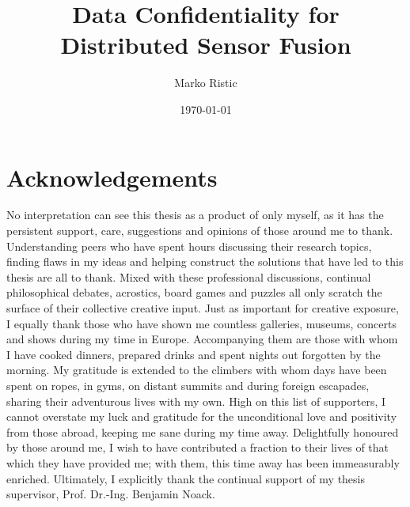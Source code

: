 \documentclass[oneside]{scrbook}
\title{Data Confidentiality for Distributed Sensor Fusion}
\author{Marko Ristic}
\date{\today}
\theoremstyle{definition}
\theoremstyle{definition}
\theoremstyle{remark}
\begin{document}
\maketitle

\frontmatter
\tableofcontents

% 
%                                     
%                                     
%                                     
% 

\chapter{Acknowledgements}
No interpretation can see this thesis as a product of only myself, as it has the persistent support, care, suggestions and opinions of those around me to thank. Understanding peers who have spent hours discussing their research topics, finding flaws in my ideas and helping construct the solutions that have led to this thesis are all to thank. Mixed with these professional discussions, continual philosophical debates, acrostics, board games and puzzles all only scratch the surface of their collective creative input. Just as important for creative exposure, I equally thank those who have shown me countless galleries, museums, concerts and shows during my time in Europe. Accompanying them are those with whom I have cooked dinners, prepared drinks and spent nights out forgotten by the morning. My gratitude is extended to the climbers with whom days have been spent on ropes, in gyms, on distant summits and during foreign escapades, sharing their adventurous lives with my own. High on this list of supporters, I cannot overstate my luck and gratitude for the unconditional love and positivity from those abroad, keeping me sane during my time away. Delightfully honoured by those around me, I wish to have contributed a fraction to their lives of that which they have provided me; with them, this time away has been immeasurably enriched. Ultimately, I explicitly thank the continual support of my thesis supervisor, Prof. Dr.-Ing. Benjamin Noack.

% 
%                                                                
%                                                                
%                                                                
% 
\end{document}
